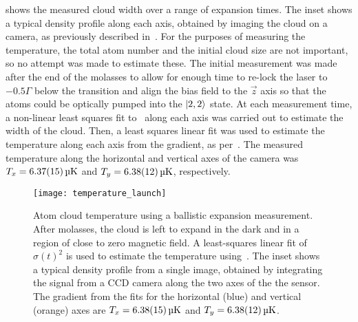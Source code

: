  shows the measured cloud width over a range of expansion times. The inset shows a typical density profile along each axis, obtained by imaging the cloud on a camera, as previously described in~. For the purposes of measuring the temperature, the total atom number and the initial cloud size are not important, so no attempt was made to estimate these. The initial measurement was made  after the end of the molasses to allow for enough time to re-lock the laser to \(-0.5\Gamma\) below the  transition and align the bias field to the \(\vec{z}\) axis so that the atoms could be optically pumped into the \(\ket{2,2}\) state. At each measurement time, a non-linear least squares fit to~ along each axis was carried out to estimate the width of the cloud. Then, a least squares linear fit was used to estimate the temperature along each axis from the gradient, as per~. The measured temperature along the horizontal and vertical axes of the camera was \(T_x = \sivalue{6.37 \pm0.15}{\micro\kelvin}\) and \(T_y = \sivalue{6.38\pm0.12}{\micro\kelvin}\), respectively.  

\begin{figure}
    \centering
    \texttt{[image: temperature\_launch]}
    \caption[Temperature measurement using ballistic expansion]{Atom cloud temperature using a ballistic expansion measurement. After molasses, the cloud is left to expand in the dark and in a region of close to zero magnetic field. A least-squares linear fit of \(\sigma(t)^2\) is used to estimate the temperature using~. The inset shows a typical density profile from a single image, obtained by integrating the signal from a CCD camera along the two axes of the the sensor. The gradient from the fits for the horizontal (blue) and vertical (orange) axes are  \(T_x = \sivalue{6.38 \pm0.15}{\micro\kelvin}\) and \(T_y = \sivalue{6.38\pm0.12}{\micro\kelvin}\).}
    \label{fig:molasses_temperature}
\end{figure}

